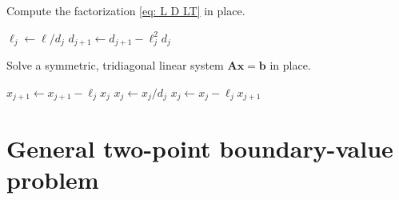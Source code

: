 \begin{algorithm}
\caption{Compute the factorization \eqref{eq: L D LT} in place.}
\label{alg: LDLT in place}
\begin{algorithmic}
\Statex
{}
\State $\ell_j\gets\ell/d_j$
\State $d_{j+1}\gets d_{j+1}-\ell_j^2d_j$
\EndFor
\EndFunction
\end{algorithmic}
\end{algorithm}

\begin{algorithm}
\caption{Solve a symmetric, tridiagonal linear system 
$\boldsymbol{A}\boldsymbol{x}=\boldsymbol{b}$ in place.}
\label{alg: solve symmetric tridiagonal in place}
\begin{algorithmic}
\Statex
{}
    \State $x_{j+1}\gets x_{j+1}-\ell_jx_j$
\EndFor
{}
    \State $x_j\gets x_j/d_j$
\EndFor
{}
    \State $x_j\gets x_j-\ell_jx_{j+1}$
\EndFor
\EndFunction
\end{algorithmic}
\end{algorithm}

\section{General two-point boundary-value problem}
\label{sec: gen two-point bvp}

